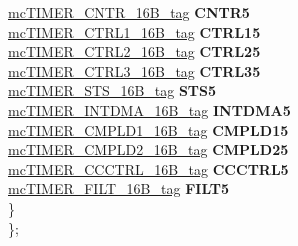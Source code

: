 \begin{DoxyCompactItemize}
\begin{tabbing}
\>\>\mbox{\hyperlink{unionmcTIMER__CNTR__16B__tag}{mcTIMER\_CNTR\_16B\_tag}} {\bfseries CNTR5}\\
\>\>\mbox{\hyperlink{unionmcTIMER__CTRL1__16B__tag}{mcTIMER\_CTRL1\_16B\_tag}} {\bfseries CTRL15}\\
\>\>\mbox{\hyperlink{unionmcTIMER__CTRL2__16B__tag}{mcTIMER\_CTRL2\_16B\_tag}} {\bfseries CTRL25}\\
\>\>\mbox{\hyperlink{unionmcTIMER__CTRL3__16B__tag}{mcTIMER\_CTRL3\_16B\_tag}} {\bfseries CTRL35}\\
\>\>\mbox{\hyperlink{unionmcTIMER__STS__16B__tag}{mcTIMER\_STS\_16B\_tag}} {\bfseries STS5}\\
\>\>\mbox{\hyperlink{unionmcTIMER__INTDMA__16B__tag}{mcTIMER\_INTDMA\_16B\_tag}} {\bfseries INTDMA5}\\
\>\>\mbox{\hyperlink{unionmcTIMER__CMPLD1__16B__tag}{mcTIMER\_CMPLD1\_16B\_tag}} {\bfseries CMPLD15}\\
\>\>\mbox{\hyperlink{unionmcTIMER__CMPLD2__16B__tag}{mcTIMER\_CMPLD2\_16B\_tag}} {\bfseries CMPLD25}\\
\>\>\mbox{\hyperlink{unionmcTIMER__CCCTRL__16B__tag}{mcTIMER\_CCCTRL\_16B\_tag}} {\bfseries CCCTRL5}\\
\>\>\mbox{\hyperlink{unionmcTIMER__FILT__16B__tag}{mcTIMER\_FILT\_16B\_tag}} {\bfseries FILT5}\\
\>\} \\
\}; \\


\end{tabbing}
\end{DoxyCompactItemize}
